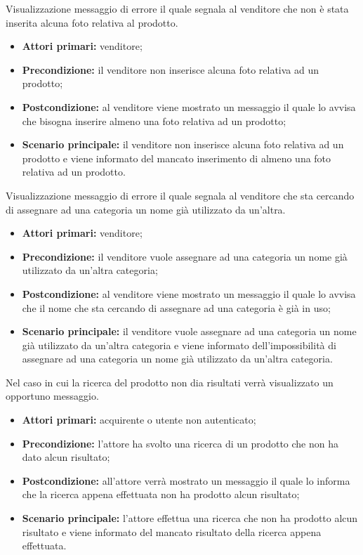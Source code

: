 Visualizzazione messaggio di errore il quale segnala al venditore che non è stata inserita alcuna foto relativa al prodotto.
\begin{itemize}
    \item \textbf{Attori primari:} venditore;
    \item \textbf{Precondizione:} il venditore non inserisce alcuna foto relativa ad un prodotto;
    \item \textbf{Postcondizione:} al venditore viene mostrato un messaggio il quale lo avvisa che bisogna inserire almeno una foto relativa ad un prodotto;
    \item \textbf{Scenario principale:} il venditore non inserisce alcuna foto relativa ad un prodotto e viene informato del mancato inserimento di almeno una foto relativa ad un prodotto.
\end{itemize}

Visualizzazione messaggio di errore il quale segnala al venditore che sta cercando di assegnare ad una categoria un nome già utilizzato da un'altra.
\begin{itemize}
    \item \textbf{Attori primari:} venditore;
    \item \textbf{Precondizione:} il venditore vuole assegnare ad una categoria un nome già utilizzato da un'altra categoria;
    \item \textbf{Postcondizione:} al venditore viene mostrato un messaggio il quale lo avvisa che il nome che sta cercando di assegnare ad una categoria è già in uso;
    \item \textbf{Scenario principale:} il venditore vuole assegnare ad una categoria un nome già utilizzato da un'altra categoria e viene informato dell'impossibilità di assegnare ad una categoria un nome già utilizzato da un'altra categoria.
\end{itemize}


Nel caso in cui la ricerca del prodotto non dia risultati verrà visualizzato un opportuno messaggio.
\begin{itemize}
	\item \textbf{Attori primari:} acquirente o utente non autenticato;
	\item \textbf{Precondizione:} l'attore ha svolto una ricerca di un prodotto che non ha dato alcun risultato;
	\item \textbf{Postcondizione:} all'attore verrà mostrato un messaggio il quale lo informa che la ricerca appena effettuata non ha prodotto alcun risultato;
	\item \textbf{Scenario principale:} l'attore effettua una ricerca che non ha prodotto alcun risultato e viene informato del mancato risultato della ricerca appena effettuata.
\end{itemize}

